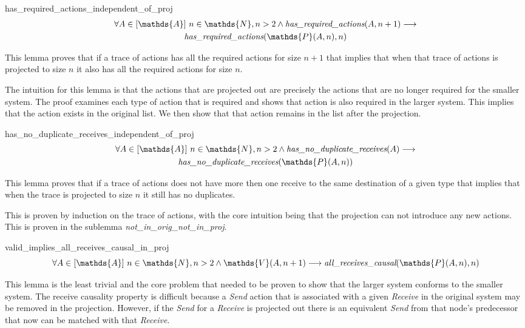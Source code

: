 \documentclass[runningheads]{llncs}
\newcommand{\action}{\mathds{A}}
\newcommand{\listaction}{[\action]}
\newcommand{\actsvalid}[2]{\mathds{V}(#1, #2)}
\newcommand{\projectsize}[2]{\mathds{P}(#1, #2)}
\newcommand{\hra}[2]{\emph{has\_required\_actions}(#1, #2)}
\newcommand{\hndr}[1]{\emph{has\_no\_duplicate\_receives}(#1)}
\newcommand{\allrc}[2]{\emph{all\_receives\_causal}(#1, #2)}
\begin{document}
\begin{lemma}{has\_required\_actions\_independent\_of\_proj}
\begin{multline*}
\forall A \in \listaction\ n \in \mathds{N}, n > 2 \wedge \hra{A}{n+1} \longrightarrow \\
\hra{\projectsize{A}{n}}{n}
\end{multline*}
\end{lemma}


This lemma proves that if a trace of actions has all the required actions for size $n+1$ that implies that when that trace of actions is projected to size $n$ it also has all the required actions for size $n$. 

The intuition for this lemma is that the actions that are projected out are precisely the actions that are no longer required for the smaller system. The proof examines each type of action that is required and shows that action is also required in the larger system. This implies that the action exists in the original list. We then show that that action remains in the list after the projection.

\begin{lemma}{has\_no\_duplicate\_receives\_independent\_of\_proj}
\begin{multline*}
\forall A \in \listaction\ n \in \mathds{N}, n > 2 \wedge \hndr{A} \longrightarrow \\
\hndr{\projectsize{A}{n}}
\end{multline*}
\end{lemma}
This lemma proves that if a trace of actions does not have more then one receive to the same destination of a given type that implies that when the trace is projected to size $n$ it still has no duplicates.

This is proven by induction on the trace of actions, with the core intuition being that the projection can not introduce any new actions. This is proven in the sublemma \emph{not\_in\_orig\_not\_in\_proj}. 


\begin{lemma}{valid\_implies\_all\_receives\_causal\_in\_proj}
$$ \forall A \in \listaction\ n \in \mathds{N}, n > 2 \wedge \actsvalid{A}{n+1} \longrightarrow \allrc{\projectsize{A}{n}}{n} $$
\end{lemma}
This lemma is the least trivial and the core problem that needed to be proven to show that the larger system conforms to the smaller system. The receive causality property is difficult because a \emph{Send} action that is associated with a given \emph{Receive} in the original system may be removed in the projection. However, if the \emph{Send} for a \emph{Receive} is projected out there is an equivalent \emph{Send} from that node's predecessor that now can be matched with that \emph{Receive}. 
\end{document}
